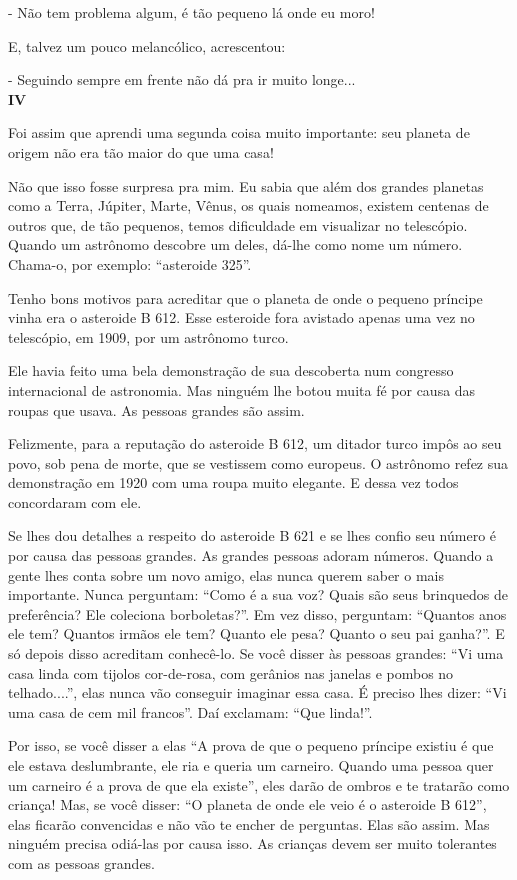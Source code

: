 \begin{Parallel}[p]{}{}
{- Não tem problema algum, é tão pequeno lá onde eu moro!

E, talvez um pouco melancólico, acrescentou:

- Seguindo sempre em frente não dá pra ir muito longe...\\

\textbf{IV}

Foi assim que aprendi uma segunda coisa muito importante: seu planeta de
origem não era tão maior do que uma casa!

Não que isso fosse surpresa pra mim. Eu sabia que além dos grandes
planetas como a Terra, Júpiter, Marte, Vênus, os quais nomeamos, existem
centenas de outros que, de tão pequenos, temos dificuldade em visualizar
no telescópio. Quando um astrônomo descobre um deles, dá-lhe como nome
um número. Chama-o, por exemplo: ``asteroide 325''.

Tenho bons motivos para acreditar que o planeta de onde o pequeno
príncipe vinha era o asteroide B 612. Esse esteroide fora avistado
apenas uma vez no telescópio, em 1909, por um astrônomo turco.

Ele havia feito uma bela demonstração de sua descoberta num congresso
internacional de astronomia. Mas ninguém lhe botou muita fé por causa
das roupas que usava. As pessoas grandes são assim.

Felizmente, para a reputação do asteroide B 612, um ditador turco impôs
ao seu povo, sob pena de morte, que se vestissem como europeus. O
astrônomo refez sua demonstração em 1920 com uma roupa muito elegante. E
dessa vez todos concordaram com ele.

Se lhes dou detalhes a respeito do asteroide B 621 e se lhes confio seu
número é por causa das pessoas grandes. As grandes pessoas adoram
números. Quando a gente lhes conta sobre um novo amigo, elas nunca
querem saber o mais importante. Nunca perguntam: ``Como é a sua voz?
Quais são seus brinquedos de preferência? Ele coleciona borboletas?''.
Em vez disso, perguntam: ``Quantos anos ele tem? Quantos irmãos ele tem?
Quanto ele pesa? Quanto o seu pai ganha?''. E só depois disso acreditam
conhecê-lo. Se você disser às pessoas grandes: ``Vi uma casa linda com
tijolos cor-de-rosa, com gerânios nas janelas e pombos no telhado....'',
elas nunca vão conseguir imaginar essa casa. É preciso lhes dizer: ``Vi
uma casa de cem mil francos''. Daí exclamam: ``Que linda!''.

Por isso, se você disser a elas ``A prova de que o pequeno príncipe
existiu é que ele estava deslumbrante, ele ria e queria um carneiro.
Quando uma pessoa quer um carneiro é a prova de que ela existe'', eles
darão de ombros e te tratarão como criança! Mas, se você disser: ``O
planeta de onde ele veio é o asteroide B 612'', elas ficarão convencidas
e não vão te encher de perguntas. Elas são assim. Mas ninguém precisa
odiá-las por causa isso. As crianças devem ser muito tolerantes com as
pessoas grandes.

}
\end{Parallel}
